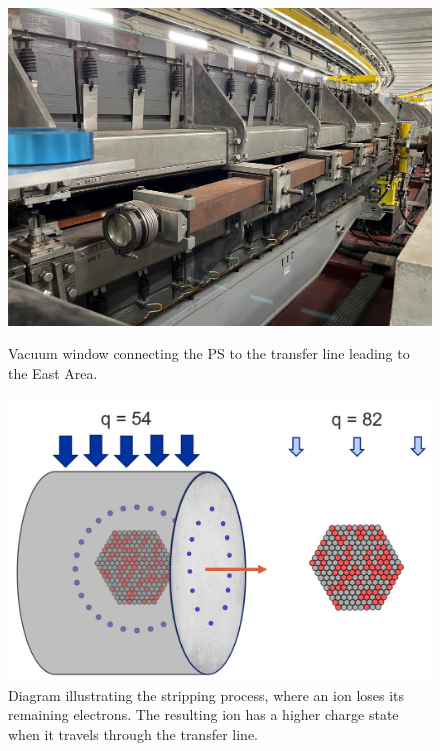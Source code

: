 \begin{figure}
    \centering
    \begin{minipage}{0.45\textwidth}
        \centering
        \includegraphics[width=1.0\textwidth]{images/PS_BEAM_ENERGY/vaccum_window.jpg}
        \caption{Vacuum window connecting the PS to the transfer line leading to the East Area.}
        \label{fig:vaccum window}
    \end{minipage}\hfill
    \begin{minipage}{0.45\textwidth}
        \centering
        \includegraphics[width=1.0\textwidth]{images/PS_BEAM_ENERGY/stripping.jpg} 
        \caption{Diagram illustrating the stripping process, where an ion loses its remaining electrons. The resulting ion has a higher charge state when it travels through the transfer line.}
        \label{fig:stripping}
    \end{minipage}
\end{figure}

